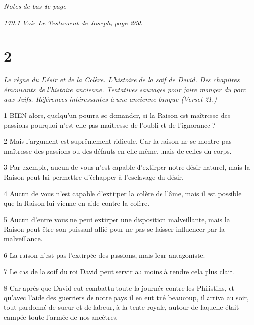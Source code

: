 \par \textit{Notes de bas de page}

\par \textit{179:1 Voir Le Testament de Joseph, page 260.}

\chapter{2}

\par \textit{Le règne du Désir et de la Colère. L'histoire de la soif de David. Des chapitres émouvants de l’histoire ancienne. Tentatives sauvages pour faire manger du porc aux Juifs. Références intéressantes à une ancienne banque (Verset 21.)}

\par 1 BIEN alors, quelqu'un pourra se demander, si la Raison est maîtresse des passions pourquoi n'est-elle pas maîtresse de l'oubli et de l'ignorance ?

\par 2 Mais l'argument est suprêmement ridicule. Car la raison ne se montre pas maîtresse des passions ou des défauts en elle-même, mais de celles du corps.

\par 3 Par exemple, aucun de vous n'est capable d'extirper notre désir naturel, mais la Raison peut lui permettre d'échapper à l'esclavage du désir.

\par 4 Aucun de vous n'est capable d'extirper la colère de l'âme, mais il est possible que la Raison lui vienne en aide contre la colère.

\par 5 Aucun d'entre vous ne peut extirper une disposition malveillante, mais la Raison peut être son puissant allié pour ne pas se laisser influencer par la malveillance.

\par 6 La raison n'est pas l'extirpée des passions, mais leur antagoniste.

\par 7 Le cas de la soif du roi David peut servir au moins à rendre cela plus clair.

\par 8 Car après que David eut combattu toute la journée contre les Philistins, et qu'avec l'aide des guerriers de notre pays il en eut tué beaucoup, il arriva au soir, tout pardonné de sueur et de labeur, à la tente royale, autour de laquelle était campée toute l'armée de nos ancêtres.

